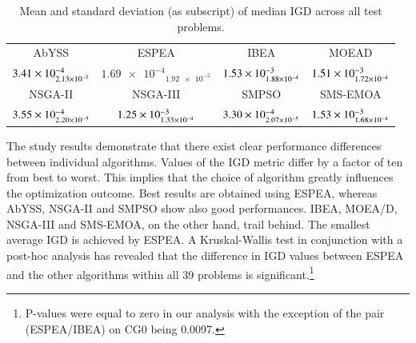 \begin{table}
\caption{Mean and standard deviation (as subscript) of median IGD across all test problems.}
\label{tbl:summary}
\centering
\begin{tabular}{*{4}{c}} \toprule
AbYSS & ESPEA & IBEA & MOEAD\\ \cmidrule(lr){1-1} \cmidrule(lr){2-2} \cmidrule(lr){3-3} \cmidrule(lr){4-4}
$\num{3.41E-4}_{\num{2.13E-5}}$ & $\num{1.69e-4}_{\num{1.92e-5}}$ & $\num{1.53E-3}_{\num{1.88E-4}}$ & $\num{1.51E-3}_{\num{1.72E-4}}$ \\ \midrule
NSGA-II & NSGA-III & SMPSO & SMS-EMOA \\ \cmidrule(lr){1-1} \cmidrule(lr){2-2} \cmidrule(lr){3-3} \cmidrule(lr){4-4}
$\num{3.55E-4}_{\num{2.20E-5}}$ & $\num{1.25E-3}_{\num{1.33E-4}}$ & $\num{3.30E-4}_{\num{2.07E-5}}$ & $\num{1.53E-3}_{\num{1.68E-4}}$ \\
\bottomrule
\end{tabular}
\end{table}

The study results demonstrate that there exist clear performance differences between individual algorithms. Values of the IGD metric differ by a factor of ten from best to worst. This implies that the choice of algorithm greatly influences the optimization outcome. Best results are obtained using ESPEA, whereas AbYSS, NSGA-II and SMPSO show also good performances. IBEA, MOEA/D, NSGA-III and SMS-EMOA, on the other hand, trail behind. The smallest average IGD is achieved by ESPEA. A Kruskal-Wallis test \cite{kruskal1952use} in conjunction with a post-hoc analysis has revealed that the difference in IGD values between ESPEA and the other algorithms within all 39 problems is significant.\footnote{P-values were equal to zero in our analysis with the exception of the pair (ESPEA/IBEA) on CG0 being 0.0097.} 

